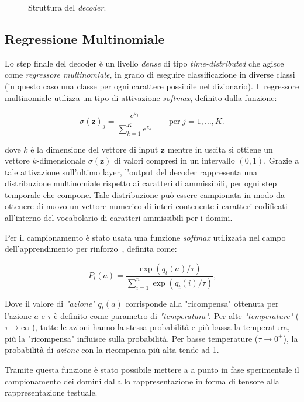\begin{figure}[p]
    \centering
	
	\caption{Struttura del \textit{decoder}.
\label{fig:decoder}}
\end{figure}

\subsection{Regressione Multinomiale}
Lo step finale del decoder è un livello \textit{dense} di tipo \textit{time-distributed} che agisce come \textit{regressore multinomiale}, in grado di eseguire classificazione in diverse classi (in questo caso una classe per ogni carattere possibile nel dizionario). Il regressore multinomiale utilizza un tipo di attivazione \textit{softmax}, definito dalla funzione:

\[\sigma(\mathbf{z})_j = \frac{e^{z_j}}{\sum_{k=1}^K e^{z_k}}\qquad  \text{per}\; j=1,\ldots,K. \] 

dove $k$ è la dimensione del vettore di input $\mathbf{z}$ mentre in uscita si ottiene un vettore $k$-dimensionale $\sigma(\mathbf{z})$ di valori compresi in un intervallo $\left(0,1\right)$. Grazie a tale attivazione sull'ultimo layer, l'output del decoder rappresenta una distribuzione multinomiale rispetto ai caratteri di ammissibili, per ogni step temporale che compone. 
Tale distribuzione può essere campionata in modo da ottenere di nuovo un vettore numerico di interi contenente i caratteri codificati all'interno del vocabolario di caratteri ammissibili per i domini. 

Per il campionamento è stato usata una funzione \textit{softmax} utilizzata nel campo dell'apprendimento per rinforzo~\cite{reinflearning}, definita come: 

\[P_t(a) = \frac{\exp(q_t(a)/\tau)}{\sum_{i=1}^n\exp(q_t(i)/\tau)} \text{,}\]

Dove il valore di\textit{ "azione"} $q_{t}(a)$ corrisponde alla "ricompensa" ottenuta per l'azione $a$ e $\tau$  è definito come parametro di \textit{"temperatura"}. Per alte \textit{"temperature"} ( $\tau \to \infty$ ), tutte le azioni hanno la stessa probabilità e più bassa la temperatura, più la "ricompensa" influisce sulla probabilità. Per basse temperature ($\tau \to 0^{+}$), la probabilità di \textit{azione} con la ricompensa più alta tende ad 1. 

Tramite questa funzione è stato possibile mettere a a punto in fase sperimentale il campionamento dei domini dalla lo rappresentazione in forma di tensore alla rappresentazione testuale.

